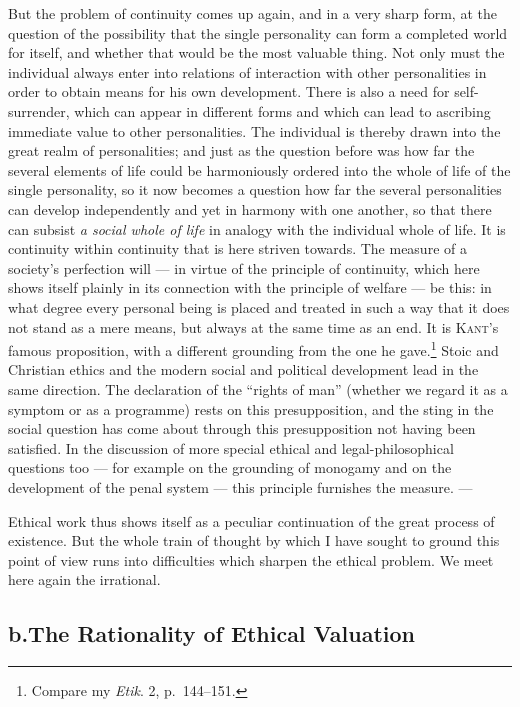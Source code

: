 \documentclass[12pt,a4paper]{book}
\newcommand{\opage}[1]{\marginnote{\footnotesize\textit{[#1]}}}
\begin{document}
But the problem of continuity comes up again, and in a very sharp form, at the
question of the possibility that the single personality can form a completed
world for itself, and whether that would be the most valuable thing. Not only
must the individual always enter into relations of interaction with other
personalities in order to obtain means for his own development. There is also a
need for self-surrender, which can appear in different forms and which can lead
to ascribing immediate value to other personalities. The individual is thereby
drawn into the great realm of personalities; and just as the question before was
how far the several elements of life could be harmoniously ordered into the whole
of life of the single personality, so it now becomes a question how far the
several personalities can develop independently and yet in harmony with one
another, so that there can subsist \emph{a social whole of life} in analogy with
the individual whole of life. It is continuity within continuity that is here
striven towards. The measure of a society's perfection will --- in virtue of the
principle of continuity, which here shows itself plainly in its connection with
the principle of welfare --- be this: in what degree every personal being is
placed and treated in such a way that it does not stand as a mere means, but
always at the same time as an end. It is \textsc{Kant}'s famous proposition, with
a different grounding from the one he gave.\footnote{Compare my \textit{Etik}. 2,
p.~144--151.} Stoic and Christian ethics and the modern social and political
development lead in the same direction. The declaration of the ``rights of man''
(whether we regard it as a symptom or as a programme) rests on this
presupposition, and the sting in the social question has come about through this
presupposition not having been satisfied. In the discussion of more special
ethical and legal-philosophical questions too --- for example on the grounding of
monogamy and on the development of the penal system --- this principle furnishes
the measure. ---

\opage{75}Ethical work thus shows itself as a peculiar continuation of the great process of
existence. But the whole train of thought by which I have sought to ground this
point of view runs into difficulties which sharpen the ethical problem. We meet
here again the irrational.

\subsection*{b.\quad The Rationality of Ethical Valuation}
\label{sec:etiske-rationalitet}
\end{document}
